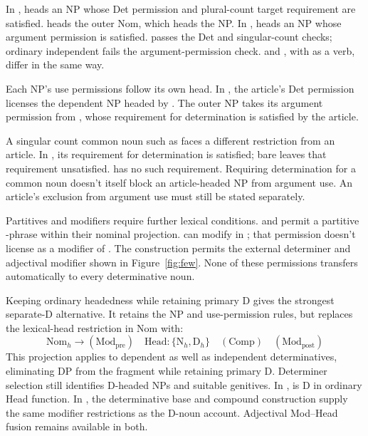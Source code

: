 \documentclass[12pt]{article}
\begin{document}
In ,  heads an NP whose Det permission and plural-count target requirement are satisfied.  heads the outer Nom, which heads the NP. In ,  heads an NP whose argument permission is satisfied.  passes the Det and singular-count checks; ordinary independent  fails the argument-permission check.  and , with  as a verb, differ in the same way.

Each NP's use permissions follow its own head. In , the article's Det permission licenses the dependent NP headed by . The outer NP takes its argument permission from , whose requirement for determination is satisfied by the article.

A singular count common noun such as  faces a different restriction from an article. In , its requirement for determination is satisfied; bare  leaves that requirement unsatisfied.  has no such requirement. Requiring determination for a common noun doesn't itself block an article-headed NP from argument use. An article's exclusion from argument use must still be stated separately.

Partitives and modifiers require further lexical conditions.  and  permit a partitive -phrase within their nominal projection.  can modify  in ; that permission doesn't license  as a modifier of . The construction  permits the external determiner and adjectival modifier shown in Figure~\ref{fig:few}. None of these permissions transfers automatically to every determinative noun.

Keeping ordinary headedness while retaining primary D gives the strongest separate-D alternative. It retains the NP and use-permission rules, but replaces the lexical-head restriction in Nom with:
\[
\mathrm{Nom}_{h}\to(\mathrm{Mod}_{\mathrm{pre}})\quad\mathrm{Head}:\{\mathrm{N}_{h},\mathrm{D}_{h}\}\quad(\mathrm{Comp})\quad(\mathrm{Mod}_{\mathrm{post}})
\]
This projection applies to dependent as well as independent determinatives, eliminating DP from the fragment while retaining primary D. Determiner selection still identifies D-headed NPs and suitable genitives. In ,  is D in ordinary Head function. In , the determinative base and compound construction supply the same modifier restrictions as the D-noun account. Adjectival Mod--Head fusion remains available in both.
\end{document}
